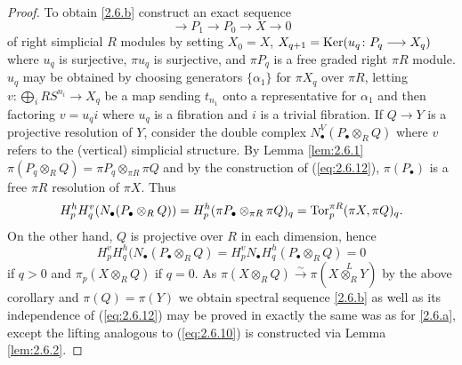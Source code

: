 \documentclass[../main]{subfiles}
\begin{document}
\begin{proof}
To obtain \ref{2.6.b} construct an exact sequence 
\begin{equation}\label{eq:2.6.12}\tag{12}
    \longrightarrow  P_1 \longrightarrow  P_0 \longrightarrow  X \longrightarrow  0
\end{equation}
of right simplicial $R$ modules by setting $X_0 = X$, $X_{q+1} = \operatorname{Ker}(u_q \colon P_{q} \longrightarrow  X_{q})$ where $u_q$ is surjective, $\pi u_q$ is surjective, and $\pi P_q$ is a free graded right $\pi R$ module. $u_q$ may be obtained by choosing generators $\{ \alpha_1 \}$ for $\pi X_q$ over $\pi R$, letting $v \colon \bigoplus_i RS^{n_i} \longrightarrow  X_q$ be a map sending $t_{n_1}$ onto a representative for $\alpha_1$ and then factoring $v = u_q i$ where $u_q$ is a fibration and $i$ is a trivial fibration. If $Q \longrightarrow  Y$ is a projective resolution of $Y$, consider the double complex $N_{\bullet }^{V} (P_{\bullet } \otimes_R Q)$ where $v$ refers to the (vertical) simplicial structure. 
By Lemma \ref{lem:2.6.1} $\pi (P_q \otimes_R Q) = \pi P_q \otimes_{\pi R} \pi Q$ and by the construction of (\ref{eq:2.6.12}), $\pi (P_{\bullet })$ is a free $\pi R$ resolution of $\pi X$. Thus 
\[H_p^{h} H_q^{v} (N_{\bullet } (P_{\bullet } \otimes_R Q)) = H_p^{h} (\pi P_{\bullet } \otimes_{\pi R} \pi Q)_q = \operatorname{Tor}_p^{\pi R} (\pi X, \pi Q)_q.\] On the other hand, $Q$ is projective over $R$ in each dimension, hence 
\[H_p^{v} H_q^{h} (N_{\bullet } (P_{\bullet } \otimes_R Q) = H_p^{v} N_{\bullet } H_q^{h} (P_{\bullet } \otimes_R Q) = 0\]
if $q > 0$ and $\pi_p (X \otimes_R Q)$ if $q = 0$. As $\pi (X \otimes_R Q ) \overset{\sim}{\to}\pi (X \overset{L}{\otimes_R} Y)$ by the above corollary and $\pi (Q) = \pi (Y)$ we obtain spectral sequence \ref{2.6.b} as well as its independence of (\ref{eq:2.6.12}) may be proved in exactly the same was as for \ref{2.6.a}, except the lifting analogous to (\ref{eq:2.6.10}) is constructed via Lemma \ref{lem:2.6.2}. 


\end{proof}
\end{document}
